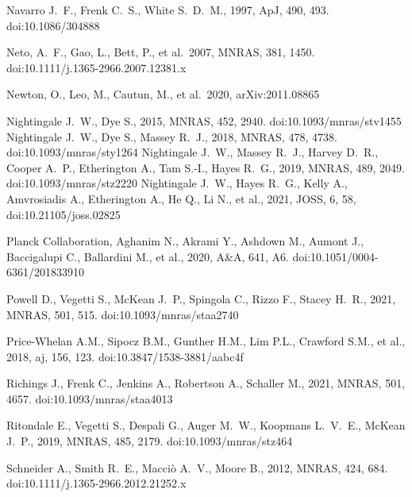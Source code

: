 \documentclass[a4paper, fleqn, usenatbib, useAMS]{mnras}
\def\mnras{MNRAS}
\begin{document}
\begin{thebibliography}{99}
 Navarro J.~F., Frenk C.~S., White S.~D.~M., 1997, ApJ, 490, 493. doi:10.1086/304888

 Neto, A.~F., Gao, L., Bett, P., et al.\ 2007, \mnras, 381, 1450. doi:10.1111/j.1365-2966.2007.12381.x

 Newton, O., Leo, M., Cautun, M., et al.\ 2020, arXiv:2011.08865


 Nightingale J.~W., Dye S., 2015, MNRAS, 452, 2940. doi:10.1093/mnras/stv1455
 Nightingale J.~W., Dye S., Massey R.~J., 2018, MNRAS, 478, 4738. doi:10.1093/mnras/sty1264
 Nightingale J.~W., Massey R.~J., Harvey D.~R., Cooper A.~P., Etherington A., Tam S.-I., Hayes R.~G., 2019, MNRAS, 489, 2049. doi:10.1093/mnras/stz2220
 Nightingale J.~W., Hayes R.~G., Kelly A., Amvrosiadis A., Etherington A., He Q., Li N., et al., 2021, JOSS, 6, 58, doi:10.21105/joss.02825

 Planck Collaboration, Aghanim N., Akrami Y., Ashdown M., Aumont J., Baccigalupi C., Ballardini M., et al., 2020, A\&A, 641, A6. doi:10.1051/0004-6361/201833910


 Powell D., Vegetti S., McKean J.~P., Spingola C., Rizzo F., Stacey H.~R., 2021, MNRAS, 501, 515. doi:10.1093/mnras/staa2740


 Price-Whelan A.M., Sipocz B.M., Gunther H.M., Lim P.L., Crawford S.M., et al., 2018, aj, 156, 123. doi:10.3847/1538-3881/aabc4f

 Richings J., Frenk C., Jenkins A., Robertson A., Schaller M., 2021, MNRAS, 501, 4657. doi:10.1093/mnras/staa4013


 Ritondale E., Vegetti S., Despali G., Auger M.~W., Koopmans L.~V.~E., McKean J.~P., 2019, MNRAS, 485, 2179. doi:10.1093/mnras/stz464

 Schneider A., Smith R.~E., Macci{\`o} A.~V., Moore B., 2012, MNRAS, 424, 684. doi:10.1111/j.1365-2966.2012.21252.x


\end{thebibliography}
\end{document}
